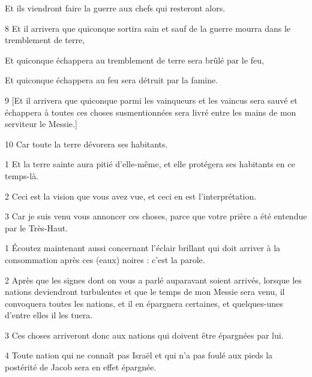 \par Et ils viendront faire la guerre aux chefs qui resteront alors.

\par 8 Et il arrivera que quiconque sortira sain et sauf de la guerre mourra dans le tremblement de terre,

\par Et quiconque échappera au tremblement de terre sera brûlé par le feu,

\par Et quiconque échappera au feu sera détruit par la famine.

\par 9 [Et il arrivera que quiconque parmi les vainqueurs et les vaincus sera sauvé et échappera à toutes ces choses susmentionnées sera livré entre les mains de mon serviteur le Messie.]

\par 10 Car toute la terre dévorera ses habitants.


\par 1 Et la terre sainte aura pitié d'elle-même, et elle protégera ses habitants en ce temps-là.

\par 2 Ceci est la vision que vous avez vue, et ceci en est l'interprétation.

\par 3 Car je suis venu vous annoncer ces choses, parce que votre prière a été entendue par le Très-Haut.


\par 1 Écoutez maintenant aussi concernant l'éclair brillant qui doit arriver à la consommation après ces (eaux) noires : c'est la parole.

\par 2 Après que les signes dont on vous a parlé auparavant soient arrivés, lorsque les nations deviendront turbulentes et que le temps de mon Messie sera venu, il convoquera toutes les nations, et il en épargnera certaines, et quelques-unes d'entre elles il les tuera.

\par 3 Ces choses arriveront donc aux nations qui doivent être épargnées par lui.

\par 4 Toute nation qui ne connaît pas Israël et qui n'a pas foulé aux pieds la postérité de Jacob sera en effet épargnée.

